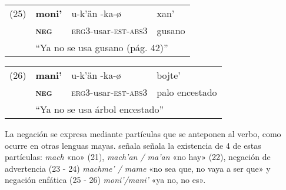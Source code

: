 {%
\begin{tabular}{llll}
(25) & \textbf{moni'} & u-k'än -ka-ø & xan' \\
& \textsc{\textbf{neg}} & \textsc{erg3}-usar-\textsc{est-abs3} & gusano \\
& \multicolumn{3}{l}{``Ya no se usa gusano (pág. 42)''}\\
\end{tabular} \vspace{0.3cm}

\begin{tabular}{llll}
(26) & \textbf{mani'} & u-k'än -ka-ø & bojte' \\
& \textsc{\textbf{neg}} & \textsc{erg3}-usar-\textsc{est-abs3} & palo encestado \\
 & \multicolumn{3}{l}{``Ya no se usa árbol encestado''} \\
\end{tabular} \vspace{0.5cm}
}

La negación se expresa mediante partículas que se anteponen al verbo, como ocurre en otras lenguas mayas. \textcolor{MidnightBlue}{\citet{ChontalTabasco}} señala señala la existencia de 4 de estas partículas: \textit{mach} «no» (21), \textit{mach'an / ma'an} «no hay» (22), negación de advertencia (23 - 24) \textit{machme' / mame} «no sea que, no vaya a ser que» y negación enfática (25 - 26) \textit{moni'/mani'} «ya no, no es».